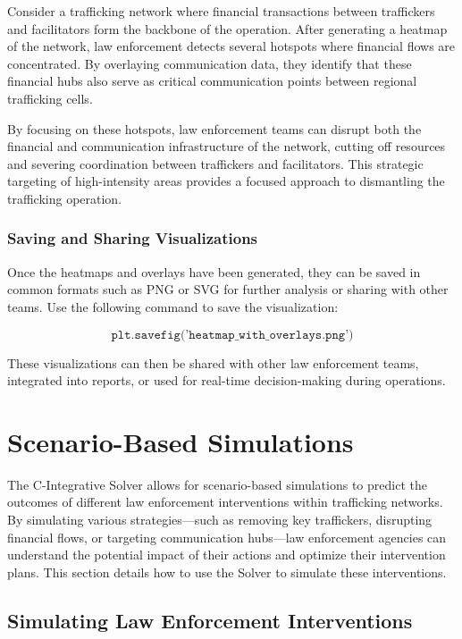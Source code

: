 \documentclass[%
 preprint, linenumbers,
 amsmath,amssymb,
 aps, physrev,
]{revtex4-2}
\begin{document}
Consider a trafficking network where financial transactions between traffickers and facilitators form the backbone of the operation. After generating a heatmap of the network, law enforcement detects several hotspots where financial flows are concentrated. By overlaying communication data, they identify that these financial hubs also serve as critical communication points between regional trafficking cells.

By focusing on these hotspots, law enforcement teams can disrupt both the financial and communication infrastructure of the network, cutting off resources and severing coordination between traffickers and facilitators. This strategic targeting of high-intensity areas provides a focused approach to dismantling the trafficking operation.

\subsubsection{Saving and Sharing Visualizations}

Once the heatmaps and overlays have been generated, they can be saved in common formats such as PNG or SVG for further analysis or sharing with other teams. Use the following command to save the visualization:

\[
\texttt{plt.savefig('heatmap\_with\_overlays.png')}
\]

These visualizations can then be shared with other law enforcement teams, integrated into reports, or used for real-time decision-making during operations.

\section{Scenario-Based Simulations}

The C-Integrative Solver allows for scenario-based simulations to predict the outcomes of different law enforcement interventions within trafficking networks. By simulating various strategies—such as removing key traffickers, disrupting financial flows, or targeting communication hubs—law enforcement agencies can understand the potential impact of their actions and optimize their intervention plans. This section details how to use the Solver to simulate these interventions.

\subsection{Simulating Law Enforcement Interventions}
\end{document}
